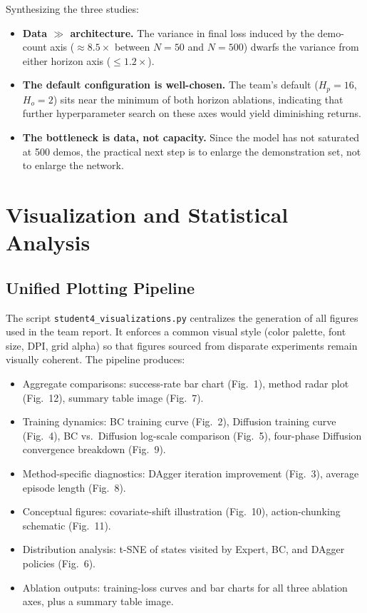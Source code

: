 \documentclass[11pt]{article}
\begin{document}
Synthesizing the three studies:

\begin{itemize}
    \item \textbf{Data $\gg$ architecture.} The variance in final loss
    induced by the demo-count axis ($\approx 8.5\times$ between $N=50$
    and $N=500$) dwarfs the variance from either horizon axis
    ($\le 1.2\times$).
    \item \textbf{The default configuration is well-chosen.} The
    team's default ($H_p = 16$, $H_o = 2$) sits near the minimum of
    both horizon ablations, indicating that further hyperparameter
    search on these axes would yield diminishing returns.
    \item \textbf{The bottleneck is data, not capacity.} Since the
    model has not saturated at 500 demos, the practical next step is
    to enlarge the demonstration set, not to enlarge the network.
\end{itemize}

\section{Visualization and Statistical Analysis}

\subsection{Unified Plotting Pipeline}

The script \texttt{student4\_visualizations.py} centralizes the
generation of all figures used in the team report. It enforces a
common visual style (color palette, font size, DPI, grid alpha) so
that figures sourced from disparate experiments remain visually
coherent. The pipeline produces:

\begin{itemize}
    \item Aggregate comparisons: success-rate bar chart
    (Fig.~1), method radar plot (Fig.~12), summary table image
    (Fig.~7).
    \item Training dynamics: BC training curve (Fig.~2), Diffusion
    training curve (Fig.~4), BC vs.\ Diffusion log-scale comparison
    (Fig.~5), four-phase Diffusion convergence breakdown (Fig.~9).
    \item Method-specific diagnostics: DAgger iteration improvement
    (Fig.~3), average episode length (Fig.~8).
    \item Conceptual figures: covariate-shift illustration
    (Fig.~10), action-chunking schematic (Fig.~11).
    \item Distribution analysis: t-SNE of states visited by Expert,
    BC, and DAgger policies (Fig.~6).
    \item Ablation outputs: training-loss curves and bar charts for
    all three ablation axes, plus a summary table image.
\end{itemize}
\end{document}

